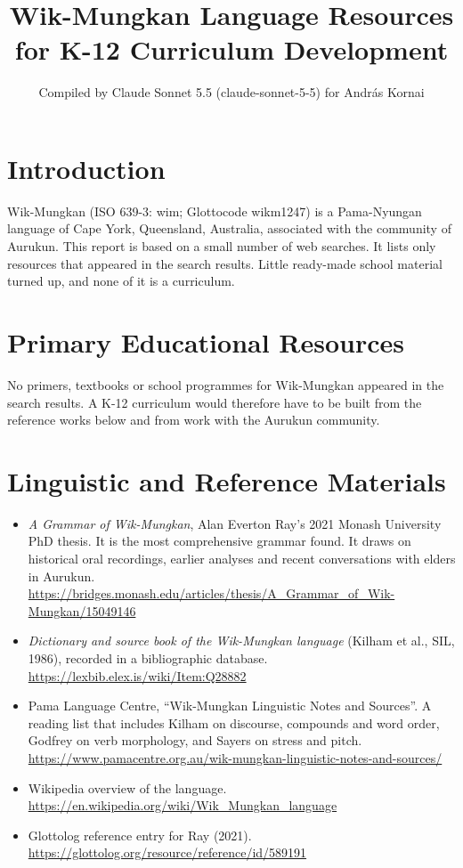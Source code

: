 \documentclass[12pt]{article}
\title{Wik-Mungkan Language Resources for K-12 Curriculum Development}
\author{Compiled by Claude Sonnet 5.5 (claude-sonnet-5-5) for Andr\'as Kornai}
\date{}
\begin{document}
\maketitle

\section{Introduction}
Wik-Mungkan (ISO 639-3: wim; Glottocode wikm1247) is a Pama-Nyungan language of Cape York, Queensland, Australia, associated with the community of Aurukun. This report is based on a small number of web searches. It lists only resources that appeared in the search results. Little ready-made school material turned up, and none of it is a curriculum.

\section{Primary Educational Resources}
No primers, textbooks or school programmes for Wik-Mungkan appeared in the search results. A K-12 curriculum would therefore have to be built from the reference works below and from work with the Aurukun community.

\section{Linguistic and Reference Materials}
\begin{itemize}
\item \emph{A Grammar of Wik-Mungkan}, Alan Everton Ray's 2021 Monash University PhD thesis. It is the most comprehensive grammar found. It draws on historical oral recordings, earlier analyses and recent conversations with elders in Aurukun. \url{https://bridges.monash.edu/articles/thesis/A_Grammar_of_Wik-Mungkan/15049146}
\item \emph{Dictionary and source book of the Wik-Mungkan language} (Kilham et al., SIL, 1986), recorded in a bibliographic database. \url{https://lexbib.elex.is/wiki/Item:Q28882}
\item Pama Language Centre, ``Wik-Mungkan Linguistic Notes and Sources''. A reading list that includes Kilham on discourse, compounds and word order, Godfrey on verb morphology, and Sayers on stress and pitch. \url{https://www.pamacentre.org.au/wik-mungkan-linguistic-notes-and-sources/}
\item Wikipedia overview of the language. \url{https://en.wikipedia.org/wiki/Wik_Mungkan_language}
\item Glottolog reference entry for Ray (2021). \url{https://glottolog.org/resource/reference/id/589191}
\end{itemize}
\end{document}

